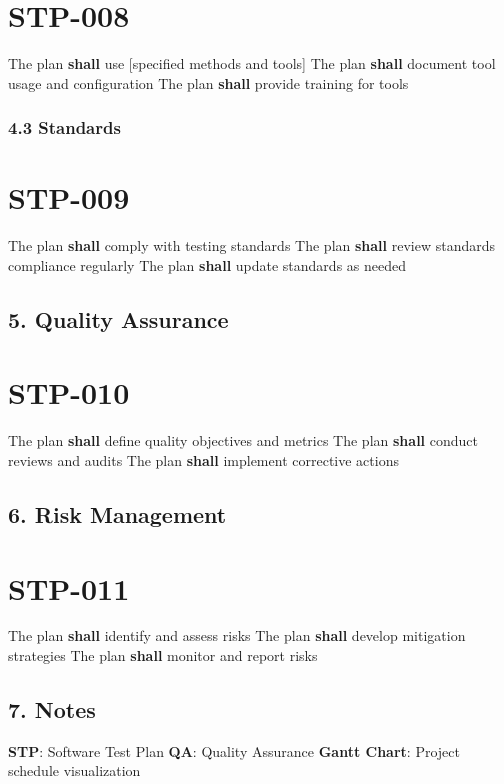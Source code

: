 \section{STP-008}\label{STP-008}

The plan \textbf{shall} use [specified methods and tools]
The plan \textbf{shall} document tool usage and configuration
The plan \textbf{shall} provide training for tools

\subsubsection{4.3 Standards}

\section{STP-009}\label{STP-009}

The plan \textbf{shall} comply with testing standards
The plan \textbf{shall} review standards compliance regularly
The plan \textbf{shall} update standards as needed

\subsection{5. Quality Assurance}

\section{STP-010}\label{STP-010}

The plan \textbf{shall} define quality objectives and metrics
The plan \textbf{shall} conduct reviews and audits
The plan \textbf{shall} implement corrective actions

\subsection{6. Risk Management}

\section{STP-011}\label{STP-011}

The plan \textbf{shall} identify and assess risks
The plan \textbf{shall} develop mitigation strategies
The plan \textbf{shall} monitor and report risks

\subsection{7. Notes}
\textbf{STP}: Software Test Plan
\textbf{QA}: Quality Assurance
\textbf{Gantt Chart}: Project schedule visualization

